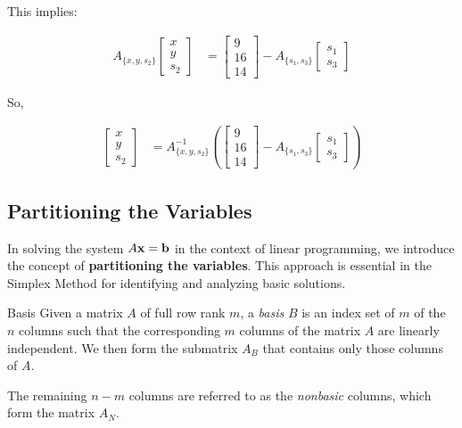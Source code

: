 \bigskip

This implies:

\begin{align*}
A_{\{x, y, s_2\}} 
\begin{bmatrix}
x \\ y \\ s_2
\end{bmatrix}
&=
\begin{bmatrix}
9 \\ 16 \\ 14
\end{bmatrix}
-
A_{\{s_1, s_3\}}
\begin{bmatrix}
s_1 \\ s_3
\end{bmatrix}
\end{align*}

\bigskip

So,

\begin{align*}
\begin{bmatrix}
x \\ y \\ s_2
\end{bmatrix}
&=
A_{\{x, y, s_2\}}^{-1}
\left(
\begin{bmatrix}
9 \\ 16 \\ 14
\end{bmatrix}
-
A_{\{s_1, s_3\}}
\begin{bmatrix}
s_1 \\ s_3
\end{bmatrix}
\right)
\end{align*}

\subsection{Partitioning the Variables}

In solving the system \( A\mathbf{x} =\mathbf{b}\) in the context of linear programming, we introduce the concept of \textbf{partitioning the variables}. This approach is essential in the Simplex Method for identifying and analyzing basic solutions.

\begin{definition}{Basis}{}
Given a matrix $A$ of full row rank $m$, a \emph{basis} $B$ is an index set of $m$ of the $n$ columns such that the corresponding $m$ columns of the matrix $A$ are linearly independent.  We then form the submatrix $A_B$ that contains only those columns of $A$. 

 The remaining \( n - m \) columns are referred to as the \emph{nonbasic} columns, which form the matrix \( A_N \). 
 \end{definition}
 
